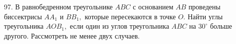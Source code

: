 97. В равнобедренном треугольнике $ABC$ с основанием $AB$ проведены биссектрисы $AA_1$ и $BB_1,$ которые пересекаются в точке $O.$ Найти углы треугольника $AOB_1,$ если один из углов треугольника $ABC$ на $30^\circ$ больше другого. Рассмотреть не менее двух случаев.\\
